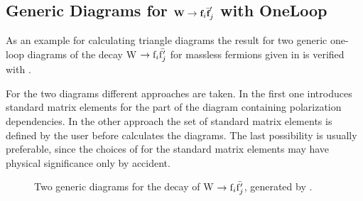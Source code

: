 \subsection{Generic Diagrams for
${\rm {\small\tt \textbf{W}}} \rightarrow {\rm {\small\tt \textbf{f}}}_i \bar{{\small\tt \textbf{f}}}'_j$ with  OneLoop}
\label{generic}

As an example for calculating triangle diagrams the result 
for two generic one-loop diagrams of the 
decay W $\rightarrow {\rm f}_i \bar{{\rm f}'_j}$ for massless fermions
given in \cite{ansgar} 
is verified with \fc. 

For the two diagrams different approaches are taken. 
In the first one \fc introduces standard matrix elements 
for the part of the diagram containing polarization 
dependencies.
In the other approach the set of standard matrix elements is defined 
by the user before \fc calculates the diagrams.
The last possibility is usually preferable, since the choices of \fc
for the standard matrix elements may have physical significance only 
by accident.

\begin{figure}[H]
\begin{center}

\caption{Two generic diagrams for the decay of W $\rightarrow {\rm f}_i \bar{{\rm f}'_j}$, generated by \fa.}
\end{center}
\end{figure}

